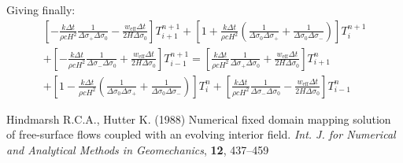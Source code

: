 \documentclass[10pt,english,a4paper]{article}
\begin{document}
%
Giving finally:
%
\begin{multline}
\left[-\frac{k\Delta t}{\rho c H^2}\frac{1}{\Delta\sigma_{+}\Delta\sigma_{0}}-\frac{w_{\mathrm{eff}}\Delta t}{2H\Delta\sigma_0}\right]T^{n+1}_{i+1}
+\left[1+\frac{k\Delta t}{\rho c H^2}\left(\frac{1}{\Delta\sigma_{0}\Delta\sigma_{+}}+\frac{1}{\Delta\sigma_{0}\Delta\sigma_{-}}\right)\right]T^{n+1}_i\\
+\left[-\frac{k\Delta t}{\rho c H^2}\frac{1}{\Delta\sigma_{-}\Delta\sigma_{0}}+\frac{w_{\mathrm{eff}}\Delta t}{2H\Delta\sigma_0}\right]T^{n+1}_{i-1}=
\left[\frac{k\Delta t}{\rho c H^2}\frac{1}{\Delta\sigma_{+}\Delta\sigma_{0}}+\frac{w_{\mathrm{eff}}\Delta t}{2H\Delta\sigma_0}\right]T^{n}_{i+1}\\
+\left[1-\frac{k\Delta t}{\rho c H^2}\left(\frac{1}{\Delta\sigma_{0}\Delta\sigma_{+}}+\frac{1}{\Delta\sigma_{0}\Delta\sigma_{-}}\right)\right]T^{n}_i
+\left[\frac{k\Delta t}{\rho c H^2}\frac{1}{\Delta\sigma_{-}\Delta\sigma_{0}}-\frac{w_{\mathrm{eff}}\Delta t}{2H\Delta\sigma_0}\right]T^{n}_{i-1}
\end{multline}
%
\begin{thebibliography}{99}
  Hindmarsh R.C.A., Hutter K. (1988) Numerical fixed domain mapping
  solution of free-surface flows coupled with an evolving interior
  field. {\it Int. J. for Numerical and Analytical Methods in
  Geomechanics}, {\bf 12}, 437--459
\end{thebibliography}
\end{document}
